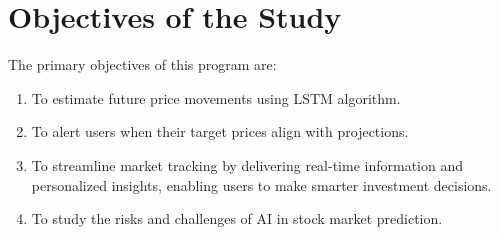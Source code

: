 \section{Objectives of the Study}

The primary objectives of this program are:
  \begin{enumerate}

\item To estimate future price movements using LSTM algorithm.

\item To alert users when their target prices align with projections.

\item To streamline market tracking by delivering real-time information and personalized insights, enabling users to make smarter investment decisions.
\item To study the risks and challenges of AI in stock market prediction.
  \end{enumerate}



    




